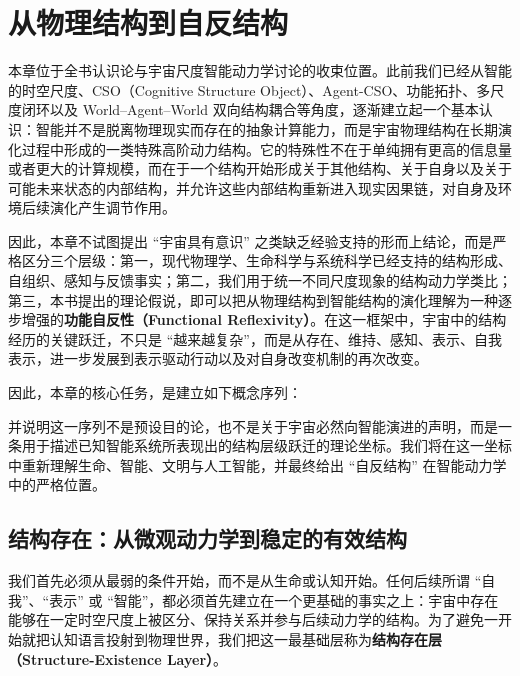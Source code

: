 \chapter{从物理结构到自反结构}
\label{chap:physical-to-reflexive-structure}

\begin{chapterlead}
本章位于全书认识论与宇宙尺度智能动力学讨论的收束位置。此前我们已经从智能的时空尺度、CSO（Cognitive Structure Object）、Agent-CSO、功能拓扑、多尺度闭环以及 World--Agent--World 双向结构耦合等角度，逐渐建立起一个基本认识：智能并不是脱离物理现实而存在的抽象计算能力，而是宇宙物理结构在长期演化过程中形成的一类特殊高阶动力结构。它的特殊性不在于单纯拥有更高的信息量或者更大的计算规模，而在于一个结构开始形成关于其他结构、关于自身以及关于可能未来状态的内部结构，并允许这些内部结构重新进入现实因果链，对自身及环境后续演化产生调节作用。

因此，本章不试图提出 ``宇宙具有意识'' 之类缺乏经验支持的形而上结论，而是严格区分三个层级：第一，现代物理学、生命科学与系统科学已经支持的结构形成、自组织、感知与反馈事实；第二，我们用于统一不同尺度现象的结构动力学类比；第三，本书提出的理论假说，即可以把从物理结构到智能结构的演化理解为一种逐步增强的\textbf{功能自反性（Functional Reflexivity）}。在这一框架中，宇宙中的结构经历的关键跃迁，不只是 ``越来越复杂''，而是从存在、维持、感知、表示、自我表示，进一步发展到表示驱动行动以及对自身改变机制的再次改变。

因此，本章的核心任务，是建立如下概念序列：
\begin{statementbox}
\centering
{}
\end{statementbox}
并说明这一序列不是预设目的论，也不是关于宇宙必然向智能演进的声明，而是一条用于描述已知智能系统所表现出的结构层级跃迁的理论坐标。我们将在这一坐标中重新理解生命、智能、文明与人工智能，并最终给出 ``自反结构'' 在智能动力学中的严格位置。
\end{chapterlead}


\section{结构存在：从微观动力学到稳定的有效结构}

我们首先必须从最弱的条件开始，而不是从生命或认知开始。任何后续所谓 ``自我''、``表示'' 或 ``智能''，都必须首先建立在一个更基础的事实之上：宇宙中存在能够在一定时空尺度上被区分、保持关系并参与后续动力学的结构。为了避免一开始就把认知语言投射到物理世界，我们把这一最基础层称为\textbf{结构存在层（Structure-Existence Layer）}。

